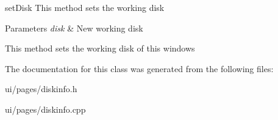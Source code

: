 set\+Disk This method sets the working disk 


\begin{DoxyParams}{Parameters}
{\em disk} & New working disk\\
\hline
\end{DoxyParams}
This method sets the working disk of this windows 

The documentation for this class was generated from the following files\+:\begin{DoxyCompactItemize}
\item 
ui/pages/diskinfo.\+h\item 
ui/pages/diskinfo.\+cpp\end{DoxyCompactItemize}
